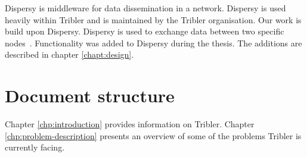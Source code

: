 Dispersy is middleware for data dissemination in a network.
Dispersy is used heavily within Tribler and is maintained by the Tribler organisation.
Our work is build upon Dispersy.
Dispersy is used to exchange data between two specific nodes~\cite{zeilemaker-dispersy}.
Functionality was added to Dispersy during the thesis.
The additions are described in chapter \ref{chapt:design}.

\section{Document structure}
Chapter \ref{chp:introduction} provides information on Tribler.
Chapter \ref{chp:problem-description} presents an overview of some of the problems Tribler is currently facing.
